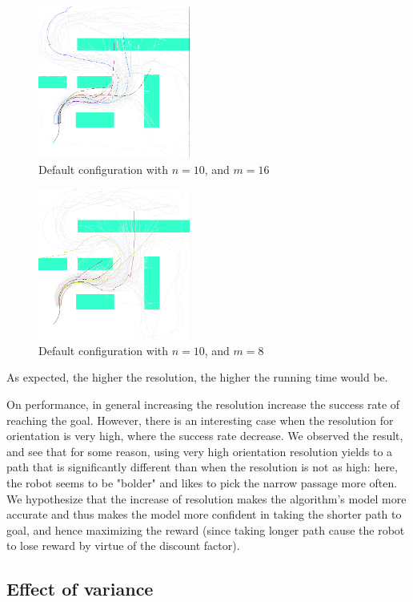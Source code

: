 \documentclass[a4paper]{article}
\begin{document}
\begin{figure}
\caption{Default configuration with $n=10$, and $m=16$}
\label{f:b_lowres_hio}
\centerline{\includegraphics[width=5cm]{b_lowres_hio.png}}
\end{figure}

\begin{figure}
\caption{Default configuration with $n=10$, and $m=8$}
\label{f:b_lowres_lowio}
\centerline{\includegraphics[width=5cm]{b_lowres_lowio.png}}
\end{figure}

As expected, the higher the resolution, the higher the running time would be.

On performance, in general increasing the resolution increase the success rate of reaching
the goal. However, there is an interesting case when the resolution
for orientation is very high, where the success rate decrease. We observed
the result, and see that for some reason, using very high orientation
resolution yields to a path that is significantly different than when the
resolution is not as high: here, the robot seems to be "bolder" and
likes to pick the narrow passage more often. We hypothesize that the increase
of resolution makes the algorithm's model more accurate and thus makes the model
more confident in taking the shorter path to goal, and hence maximizing the
reward (since taking longer path cause the robot to lose reward by virtue
of the discount factor).

\subsection{Effect of variance}
\end{document}

